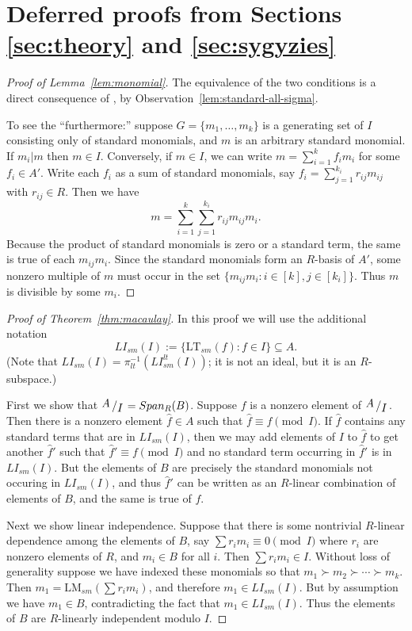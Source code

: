 \documentclass[11pt,reqno]{amsart}
\newcommand{\suchthat}{:}
\newcommand{\bigslant}[2]{{\raisebox{.2em}{$#1$}\left/\raisebox{-.2em}{$#2$}\right.}}
\newcommand{\lmsm}{\text{LM}_{sm}}
\newcommand{\ltsm}{\text{LT}_{sm}}
\newcommand{\lismlt}{LI_{sm}^{lt}}
\newcommand{\lism}{LI_{sm}}
\theoremstyle{definition}
\numberwithin{equation}{section}
\begin{document}
\section{Deferred proofs from Sections \ref{sec:theory} and \ref{sec:sygyzies}}
\label{sec:app:theory}



\begin{proof}[Proof of Lemma~\ref{lem:monomial}]
The equivalence of the two conditions is a direct consequence of \cite[Cor.~1.6(b)]{ES}, by Observation~\ref{lem:standard-all-sigma}.

To see the ``furthermore:'' suppose $G = \{m_1, \dotsc, m_k\}$ is a generating set of $I$ consisting only of standard monomials, and $m$ is an arbitrary standard monomial. If $m_i | m$ then $m \in I$. Conversely, if $m \in I$, we can write $m = \sum_{i=1}^k f_i m_i$ for some $f_i \in A'$. Write each $f_i$ as a sum of standard monomials, say $f_i = \sum_{j=1}^{k_i} r_{ij} m_{ij}$ with $r_{ij} \in R$. Then we have \[m = \sum_{i=1}^k \sum_{j=1}^{k_i} r_{ij} m_{ij} m_i.\] Because the product of standard monomials is zero or a standard term, the same is true of each $m_{ij} m_i$. Since the standard monomials form an $R$-basis of $A'$, some nonzero multiple of $m$ must occur in the set $\{m_{ij} m_i \suchthat i \in [k], j \in [k_i]\}$. Thus $m$ is divisible by some $m_i$.
\end{proof}


\begin{proof}[Proof of Theorem~\ref{thm:macaulay}]
In this proof we will use the additional notation 
\[
\lism(I) := \{ \ltsm(f) \suchthat f \in I \}  \subseteq A.
\] 
(Note that $\lism(I) = \pi_{lt}^{-1}(\lismlt(I))$; it is not an ideal, but it is an $R$-subspace.)

First we show that $\bigslant{A}{I} = Span_R(B)$. Suppose $f$ is a nonzero element of $\bigslant{A}{I}$. Then there is a nonzero element $\hat{f} \in A$ such that $\hat{f} \equiv f \pmod{I}$. If $\hat{f}$ contains any standard terms that are in $\lism(I)$, then we may add elements of $I$ to $\hat{f}$ to get another $\hat{f}'$ such that $\hat{f}' \equiv f \pmod I$ and no standard term occurring in $\hat{f}'$ is in $\lism(I)$. But the elements of $B$ are precisely the standard monomials not occuring in $\lism(I)$, and thus $\hat{f}'$ can be written as an $R$-linear combination of elements of $B$, and the same is true of $f$.

Next we show linear independence. Suppose that there is some nontrivial $R$-linear dependence among the elements of $B$, say $\sum r_i m_i \equiv 0 \pmod{I}$ where $r_i$ are nonzero elements of $R$, and $m_i \in B$ for all $i$. Then $\sum r_i m_i \in I$. Without loss of generality suppose we have indexed these monomials so that $m_1 \succ m_2 \succ \dotsb \succ m_k$. Then $m_1 = \lmsm\left(\sum r_i m_i\right)$, and therefore $m_1 \in \lism(I)$. But by assumption we have $m_1 \in B$, contradicting the fact that $m_1 \in \lism(I)$. Thus the elements of $B$ are $R$-linearly independent modulo $I$.
\end{proof}
\end{document}
